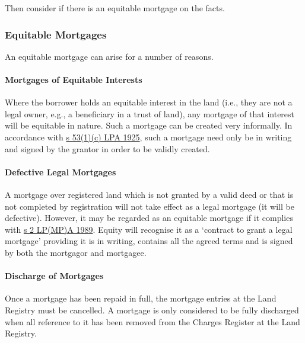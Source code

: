 \documentclass[
]{article}
\begin{document}
Then consider if there is an equitable mortgage on the facts.

\hypertarget{equitable-mortgages}{%
\subsubsection{Equitable Mortgages}\label{equitable-mortgages}}

An equitable mortgage can arise for a number of reasons.

\hypertarget{mortgages-of-equitable-interests}{%
\paragraph{Mortgages of Equitable
Interests}\label{mortgages-of-equitable-interests}}

Where the borrower holds an equitable interest in the land (i.e., they
are not a legal owner, e.g., a beneficiary in a trust of land), any
mortgage of that interest will be equitable in nature. Such a mortgage
can be created very informally. In accordance with
\href{https://www.legislation.gov.uk/ukpga/Geo5/15-16/20/section/53}{s
53(1)(c) LPA 1925}, such a mortgage need only be in writing and signed
by the grantor in order to be validly created.

\hypertarget{defective-legal-mortgages}{%
\paragraph{Defective Legal Mortgages}\label{defective-legal-mortgages}}

A mortgage over registered land which is not granted by a valid deed or
that is not completed by registration will not take effect as a legal
mortgage (it will be defective). However, it may be regarded as an
equitable mortgage if it complies with
\href{https://www.legislation.gov.uk/ukpga/1989/34/section/2}{s 2
LP(MP)A 1989}. Equity will recognise it as a `contract to grant a legal
mortgage' providing it is in writing, contains all the agreed terms and
is signed by both the mortgagor and mortgagee.

\hypertarget{discharge-of-mortgages}{%
\paragraph{Discharge of Mortgages}\label{discharge-of-mortgages}}

Once a mortgage has been repaid in full, the mortgage entries at the
Land Registry must be cancelled. A mortgage is only considered to be
fully discharged when all reference to it has been removed from the
Charges Register at the Land Registry.
\end{document}
